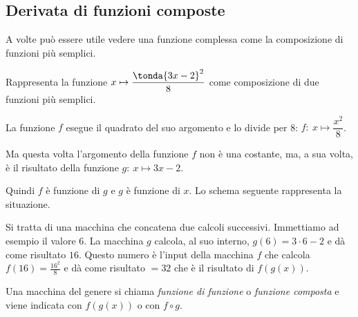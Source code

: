 \subsection{Derivata di funzioni composte}
\label{subsec:differenziazione_derivatacomposta}


A volte può essere utile vedere una funzione complessa come la 
composizione di funzioni più semplici. 

\begin{esempio}
Rappresenta la funzione  \(x \mapsto \dfrac{\tonda{3x -2}^2}{8}\)
come composizione di due funzioni più semplici. 

La funzione \(f\) esegue il quadrato del suo argomento e lo divide per 8:
\(f:~ x \mapsto \dfrac{x^2}{8}\).

Ma questa volta l'argomento della funzione \(f\) non è una costante, ma,
a sua volta, è il risultato della funzione \(g:~x \mapsto 3x -2\).

Quindi \(f\) è funzione di \(g\) e \(g\) è funzione di \(x\).
Lo schema seguente rappresenta la situazione.

\begin{center} \scalebox{1}{\boxfcompostaa} \end{center}
\label{gra:differenziazione_boxcompostaa}

Si tratta di una macchina che concatena due calcoli successivi. 
Immettiamo ad esempio il valore \(6\). 
La macchina \(g\) calcola, al suo interno, \(g(6)=3\cdot 6-2\) e dà come 
risultato \(16\).
Questo numero è l'input della macchina \(f\) che calcola 
\(f(16)=\frac{16^2}{8}\) e dà come risultato \(=32\)
che è il risultato di \(f(g(x))\).
\end{esempio}

Una macchina del genere si chiama \emph{funzione di funzione} o
\emph{funzione composta} e 
viene indicata con \(f(g(x))\) o con \(f \circ g\).


